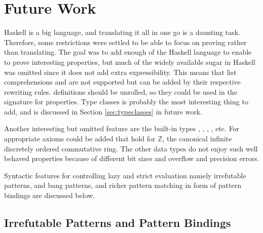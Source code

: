%






\section{Future Work}

Haskell is a big language, and translating it all in one go is a
daunting task. Therefore, some restrictions were settled to be able to
focus on proving rather than translating.  The goal was to add enough
of the Haskell language to enable to prove interesting properties, but
much of the widely available sugar in Haskell was omitted since it
does not add extra expressibility. This means that list comprehensions
and are not supported but can be added by their respective rewriting
rules.  definitions should be unrolled, so they could be
used in the signature for properties. Type classes is probably the
most interesting thing to add, and is discussed in Section
\ref{sec:typeclasses} in future work.

Another interesting but omitted feature are the built-in types
, , , , etc. For 
appropriate axioms could be added that hold for $\mathbb{Z}$, the
canonical infinite discretely ordered commutative ring.  The other
data types do not enjoy such well behaved properties because of
different bit sizes and overflow and precision errors.

Syntactic features for controlling lazy and strict evaluation namely
irrefutable patterns,  and bang patterns, and richer pattern
matching in form of pattern bindings are discussed below.

\begin{comment}
 It should be
noted that it is already possible to prove a lot of interesting
Haskell properties, it is far from able to prove things about bigger
Haskell projects which usually use a richer part of the language.
\end{comment}

\subsection{Irrefutable Patterns and Pattern Bindings}


